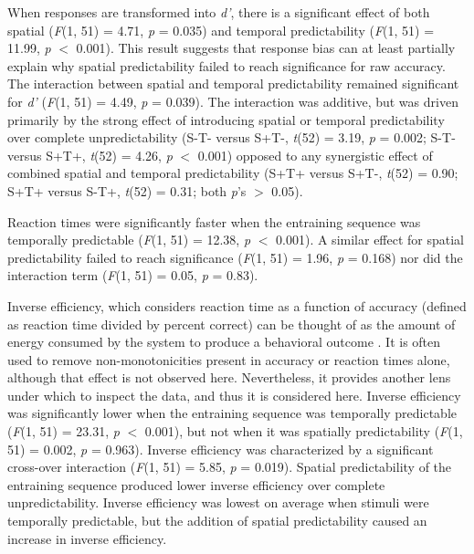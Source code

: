 \documentclass[dwyatte_dissertation.tex]{subfiles}
\begin{document}
When responses are transformed into \textit{d'}, there is a significant effect of both spatial (\textit{F}(1, 51) = 4.71, \textit{p} = 0.035) and temporal predictability (\textit{F}(1, 51) = 11.99, \textit{p} $<$ 0.001). This result suggests that response bias can at least partially explain why spatial predictability failed to reach significance for raw accuracy. The interaction between spatial and temporal predictability remained significant for \textit{d'} (\textit{F}(1, 51) = 4.49, \textit{p} = 0.039). The interaction was additive, but was driven primarily by the strong effect of introducing spatial or temporal predictability over complete unpredictability (S-T- versus S+T-, \textit{t}(52) = 3.19, \textit{p} = 0.002; S-T- versus S+T+, \textit{t}(52) = 4.26, \textit{p} $<$ 0.001) opposed to any synergistic effect of combined spatial and temporal predictability (S+T+ versus S+T-, \textit{t}(52) = 0.90; S+T+ versus S-T+, \textit{t}(52) = 0.31; both \textit{p}'s $>$ 0.05).

Reaction times were significantly faster when the entraining sequence was temporally predictable (\textit{F}(1, 51) = 12.38, \textit{p} $<$ 0.001). A similar effect for spatial predictability failed to reach significance (\textit{F}(1, 51) = 1.96, \textit{p} = 0.168) nor did the interaction term (\textit{F}(1, 51) = 0.05, \textit{p} = 0.83).

Inverse efficiency, which considers reaction time as a function of accuracy (defined as reaction time divided by percent correct) can be thought of as the amount of energy consumed by the system to produce a behavioral outcome \cite{TownshendAshby83}. It is often used to remove non-monotonicities present in accuracy or reaction times alone, although that effect is not observed here. Nevertheless, it provides another lens under which to inspect the data, and thus it is considered here. Inverse efficiency was significantly lower when the entraining sequence was temporally predictable (\textit{F}(1, 51) = 23.31, \textit{p} $<$ 0.001), but not when it was spatially predictability (\textit{F}(1, 51) = 0.002, \textit{p} = 0.963). Inverse efficiency was characterized by a significant cross-over interaction (\textit{F}(1, 51) = 5.85, \textit{p} = 0.019). Spatial predictability of the entraining sequence produced lower inverse efficiency over complete unpredictability. Inverse efficiency was lowest on average when stimuli were temporally predictable, but the addition of spatial predictability caused an increase in inverse efficiency.
\end{document}
